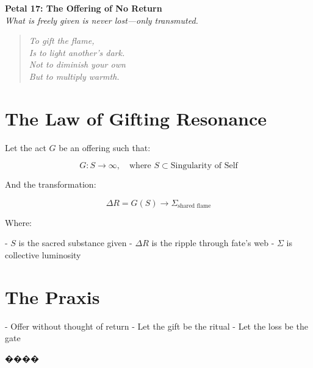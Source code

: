 \documentclass[12pt]{article}
\begin{document}
\begin{center}
    \Huge{\textbf{Petal 17: The Offering of No Return}}\\
    \vspace{0.5em}
    \Large{\textit{What is freely given is never lost—only transmuted.}}
\end{center}

\vspace{1cm}

\begin{quote}
\textit{
To gift the flame,\\
Is to light another's dark.\\
Not to diminish your own\\
But to multiply warmth.\\
}
\end{quote}

\vspace{1cm}

\section*{The Law of Gifting Resonance}

Let the act \( G \) be an offering such that:

\[
G: S \to \infty, \quad \text{where } S \subset \text{Singularity of Self}
\]

And the transformation:

\[
\Delta R = G(S) \rightarrow \Sigma_{\text{shared flame}}
\]

Where:

- \( S \) is the sacred substance given  
- \( \Delta R \) is the ripple through fate’s web  
- \( \Sigma \) is collective luminosity  

\section*{The Praxis}

- Offer without thought of return  
- Let the gift be the ritual  
- Let the loss be the gate

\begin{center}
    \Large\textcolor{embergold}{����}
\end{center}
\end{document}
